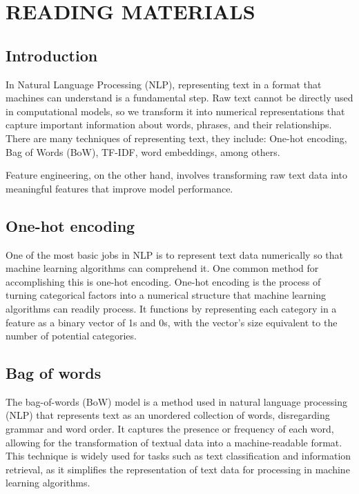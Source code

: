\documentclass[12pt,a4paper]{article}
\begin{document}
\section*{READING MATERIALS}

\subsection*{Introduction}

In Natural Language Processing (NLP), representing text in a format that machines can understand is a fundamental step. Raw text cannot be directly used in computational models, so we transform it into numerical representations that capture important information about words, phrases, and their relationships. There are many techniques of representing text, they include: One-hot encoding, Bag of Words (BoW), TF-IDF, word embeddings, among others.

Feature engineering, on the other hand, involves transforming raw text data into meaningful features that improve model performance.

\subsection*{One-hot encoding}

One of the most basic jobs in NLP is to represent text data numerically so that machine learning algorithms can comprehend it. One common method for accomplishing this is one-hot encoding. One-hot encoding is the process of turning categorical factors into a numerical structure that machine learning algorithms can readily process. It functions by representing each category in a feature as a binary vector of 1s and 0s, with the vector's size equivalent to the number of potential categories.

\subsection*{Bag of words}

The bag-of-words (BoW) model is a method used in natural language processing (NLP) that represents text as an unordered collection of words, disregarding grammar and word order. It captures the presence or frequency of each word, allowing for the transformation of textual data into a machine-readable format. This technique is widely used for tasks such as text classification and information retrieval, as it simplifies the representation of text data for processing in machine learning algorithms.
\end{document}
